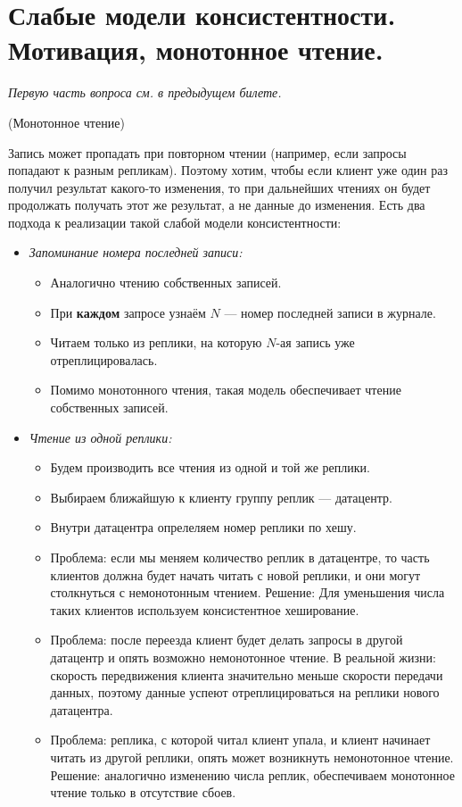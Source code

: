 \section{Слабые модели консистентности. Мотивация, монотонное чтение.}

\textit{Первую часть вопроса см. в предыдущем билете.}

\begin{example}(Монотонное чтение)

    Запись может пропадать при повторном чтении (например, если запросы попадают к разным репликам). Поэтому хотим, чтобы если клиент уже один раз получил результат какого-то изменения, то при дальнейших чтениях он будет продолжать получать этот же результат, а не данные до изменения. Есть два подхода к реализации такой слабой модели консистентности:
    \begin{itemize}
        \item \textit{Запоминание номера последней записи:}
        \begin{itemize}
            \item Аналогично чтению собственных записей.
            \item При \textbf{каждом} запросе узнаём $N$ --- номер последней записи в журнале.
            \item Читаем только из реплики, на которую $N$-ая запись уже отреплицировалась.
            \item Помимо монотонного чтения, такая модель обеспечивает чтение собственных записей.
        \end{itemize}

        \item \textit{Чтение из одной реплики:}
        \begin{itemize}
            \item Будем производить все чтения из одной и той же реплики.
            \item Выбираем ближайшую к клиенту группу реплик --- датацентр.
            \item Внутри датацентра опрелеляем номер реплики по хешу.
            \item Проблема: если мы меняем количество реплик в датацентре, то часть клиентов должна будет начать читать с новой реплики, и они могут столкнуться с немонотонным чтением. Решение: Для уменьшения числа таких клиентов используем консистентное хеширование.
            \item Проблема: после переезда клиент будет делать запросы в другой датацентр и опять возможно немонотонное чтение. В реальной жизни: скорость передвижения клиента значительно меньше скорости передачи данных, поэтому данные успеют отреплицироваться на реплики нового датацентра.
            \item Проблема: реплика, с которой читал клиент упала, и клиент начинает читать из другой реплики, опять может возникнуть немонотонное чтение. Решение: аналогично изменению числа реплик, обеспечиваем монотонное чтение только в отсутствие сбоев.
        \end{itemize}
    \end{itemize}

\end{example}
